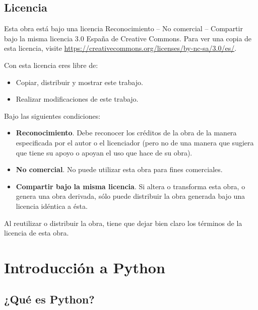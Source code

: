 \documentclass[
  spanish,
  a4paper,
]{scrreport}
\providecommand{\tightlist}{%
  \setlength{\itemsep}{0pt}\setlength{\parskip}{0pt}}
\begin{document}
\section*{Licencia}\label{licencia}


Esta obra está bajo una licencia Reconocimiento -- No comercial --
Compartir bajo la misma licencia 3.0 España de Creative Commons. Para
ver una copia de esta licencia, visite
\url{https://creativecommons.org/licenses/by-nc-sa/3.0/es/}.

Con esta licencia eres libre de:

\begin{itemize}
\tightlist
\item
  Copiar, distribuir y mostrar este trabajo.
\item
  Realizar modificaciones de este trabajo.
\end{itemize}

Bajo las siguientes condiciones:

\begin{itemize}
\item
  \textbf{Reconocimiento}. Debe reconocer los créditos de la obra de la
  manera especificada por el autor o el licenciador (pero no de una
  manera que sugiera que tiene su apoyo o apoyan el uso que hace de su
  obra).
\item
  \textbf{No comercial}. No puede utilizar esta obra para fines
  comerciales.
\item
  \textbf{Compartir bajo la misma licencia}. Si altera o transforma esta
  obra, o genera una obra derivada, sólo puede distribuir la obra
  generada bajo una licencia idéntica a ésta.
\end{itemize}

Al reutilizar o distribuir la obra, tiene que dejar bien claro los
términos de la licencia de esta obra.


\chapter{Introducción a Python}\label{introducciuxf3n-a-python}

\section{¿Qué es Python?}\label{quuxe9-es-python}
\end{document}
